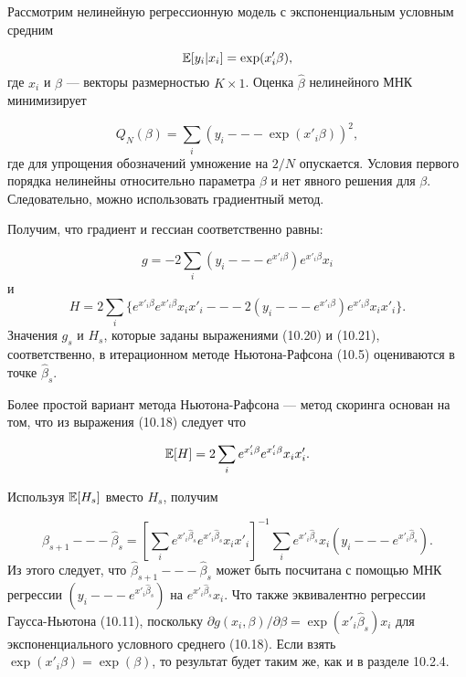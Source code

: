 Рассмотрим нелинейную регрессионную модель с экспоненциальным условным средним

\begin{equation}
\mathbb{E}[y_i|x_i] = \exp(x'_i\beta),
\end{equation}
где $x_i$ и $\beta$ --- векторы размерностью $K \times 1$. Оценка $\hat{\beta}$ нелинейного МНК минимизирует

\begin{equation}
Q_N(\beta) = \sum_i(y_i --- \exp(x'_i\beta))^2,
\end{equation}
где для упрощения обозначений умножение на $2/N$ опускается. Условия первого порядка нелинейны относительно параметра $\beta$ и нет явного решения для $\beta$. Следовательно, можно использовать градиентный метод.

Получим, что градиент и гессиан соответственно равны:

\begin{equation}
g = -2\sum_i(y_i --- e^{x'_i\beta})e^{x'_i\beta}x_i
\end{equation}
и
\begin{equation}
H = 2\sum_i\lbrace{e^{x'_i\beta} e^{x'_i\beta} x_{i}x'_{i} --- 2(y_i --- e^{x'_i \beta})e^{x'_i\beta} x_{i}x'_{i}} \rbrace.
\end{equation}
Значения $g_s$ и $H_s$, которые заданы выражениями (10.20) и (10.21), соответственно, в итерационном методе Ньютона-Рафсона (10.5) оцениваются в точке $\hat{\beta}_s$.

Более простой вариант метода Ньютона-Рафсона --- метод скоринга основан на том, что из выражения (10.18) следует что

\begin{equation}
\mathbb{E}[H] = 2\sum_{i} e^{x'_i\beta}e ^{x'_i\beta} x_{i}x'_{i}.
\end{equation} 

Используя $\mathbb{E}[H_s]$ вместо $H_s$, получим

\[
\hat{\beta}_{s+1} --- \hat{\beta}_s =\left[\sum_{i}e^{x'_i \hat{\beta}_s} e^{x'_i \hat{\beta}_s} x_{i}x'_{i} \right]^{-1} \sum_{i} e^{x'_{i}\hat{\beta}_s} x_{i} (y_i --- e^{x'_{i}\hat{\beta}_s}).
\]
Из этого следует, что $\hat{\beta}_{s+1} --- \hat{\beta}_s$ может быть посчитана с помощью МНК регрессии $(y_i --- e^{x'_i\hat{\beta}_s})$ на $e^{x'_i\hat{\beta}_s}x_i$. Что также эквивалентно регрессии Гаусса-Ньютона (10.11), поскольку $\partial{g(x_{i},\beta)}/\partial{\beta} = \exp(x'_i\hat{\beta}_s)x_i$ для экспоненциального условного среднего (10.18). Если взять $\exp(x'_i\beta) = \exp(\beta)$, то результат будет  таким же, как и в разделе 10.2.4. 

